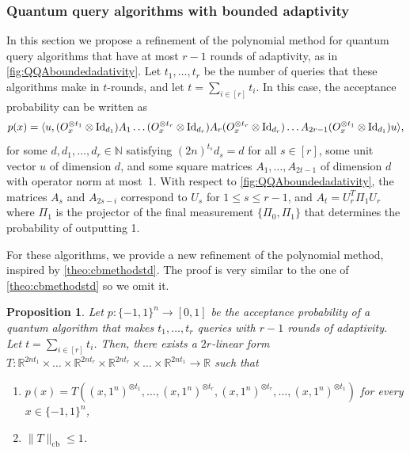 \documentclass[11pt]{article}
\DeclareMathOperator{\cb}{cb}
\newcommand{\norm}[1]{\|#1\|}
\newcommand{\R}{\mathbb{R}} %
\newcommand{\1}{\mathbf{1}}
\newcommand{\Id}{\ensuremath{\mathop{\rm Id}\nolimits}}
\theoremstyle{plain}
\newtheorem{proposition}[theorem]{Proposition}
\theoremstyle{definition}
\theoremstyle{remark}
\begin{document}
\subsubsection{Quantum query algorithms with bounded adaptivity} In this section we propose a refinement of the polynomial method for quantum query algorithms that have at most $r-1$ rounds of adaptivity, as in \cref{fig:QQAboundedadativity}. Let $t_1,\dots,t_r$ be the number of queries that these algorithms make in $t$-rounds, and let $t=\sum_{i\in [r]}t_i$. In this case, the acceptance probability can be written as 
\begin{equation}\label{eq:QQAboundedadap}
    p(x)=\langle u, (O_x^{\otimes t_1}\otimes \Id_{d_1})A_{1}\dots  (O_x^{\otimes t_r}\otimes \Id_{d_r}) A_r (O_x^{\otimes t_r}\otimes \Id_{d_r})  \dots A_{2r-1} (O_x^{\otimes t_1}\otimes \Id_{d_1}) u\rangle,
\end{equation}
for some $d,d_1,\dots,d_r\in\mathbb N$ satisfying $(2n)^{t_s}d_s=d$ for all $s\in [r]$, some unit vector $u$ of dimension $d$, and some square matrices  $A_1,\dots, A_{2t-1}$ of dimension $d$ with operator norm at most~1. With respect to \cref{fig:QQAboundedadativity}, the matrices $A_s$ and $A_{2s-i}$ correspond to $U_s$ for $1\leq s\leq r-1$, and $A_t=U_r^T\Pi_1U_r$ where $\Pi_1$ is the projector of the final measurement $\{\Pi_0,\Pi_1\}$ that determines the probability of outputting 1. 

For these algorithms, we provide a new refinement of the polynomial method, inspired by \cref{theo:cbmethodstd}. The proof is very similar to the one of \cref{theo:cbmethodstd} so we omit it.

\begin{proposition}\label{theo:cbmethodboundedadapt}
    Let $p:\{-1,1\}^n\to [0,1]$ be the acceptance probability of a quantum algorithm that makes $t_1,\dots,t_r$ queries with $r-1$ rounds of adaptivity. Let $t=\sum_{i\in [r]}t_i$. Then, there exists a $2r$-linear form $T:\mathbb R^{2nt_1}\times\dots\times \mathbb R^{2nt_r}\times \mathbb R^{2nt_r}\times\dots\times\R^{2nt_1}\to \R$ such that 
    \begin{enumerate}
        \item $p(x)=T((x,1^n)^{\otimes t_1},\dots,(x,1^n)^{\otimes t_r},(x,1^n)^{\otimes t_r},\dots,(x,1^n)^{\otimes t_1})$ for every $x\in\{-1,1\}^n$, 
        
        \item $\norm{T}_{\cb}\leq 1$.
        
    \end{enumerate}
\end{proposition}
\end{document}
